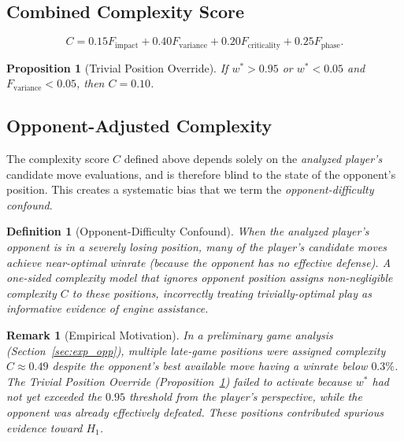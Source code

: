 \documentclass[11pt,a4paper]{article}
\newtheorem{definition}{Definition}
\newtheorem{proposition}{Proposition}
\newtheorem{remark}{Remark}
\begin{document}
\subsection{Combined Complexity Score}

\begin{equation}
    C = 0.15 F_{\text{impact}} + 0.40 F_{\text{variance}}
    + 0.20 F_{\text{criticality}} + 0.25 F_{\text{phase}}.
    \label{eq:complexity}
\end{equation}

\begin{proposition}[Trivial Position Override]
\label{prop:trivial}
If $w^* > 0.95$ or $w^* < 0.05$ and $F_{\text{variance}} < 0.05$,
then $C = 0.10$.
\end{proposition}

\subsection{Opponent-Adjusted Complexity}
\label{sec:opp_complexity}

The complexity score $C$ defined above depends solely on the \emph{analyzed
player's} candidate move evaluations, and is therefore blind to the state
of the opponent's position. This creates a systematic bias that we term
the \emph{opponent-difficulty confound}.

\begin{definition}[Opponent-Difficulty Confound]
\label{def:opp_confound}
When the analyzed player's opponent is in a severely losing position,
many of the player's candidate moves achieve near-optimal winrate
(because the opponent has no effective defense). A one-sided complexity
model that ignores opponent position assigns non-negligible complexity
$C$ to these positions, incorrectly treating trivially-optimal play as
informative evidence of engine assistance.
\end{definition}

\begin{remark}[Empirical Motivation]
\label{rem:opp_motivation}
In a preliminary game analysis (Section~\ref{sec:exp_opp}), multiple
late-game positions were assigned complexity $C \approx 0.49$ despite the
opponent's best available move having a winrate below $0.3\%$.
The Trivial Position Override (Proposition~\ref{prop:trivial}) failed to
activate because $w^*$ had not yet exceeded the $0.95$ threshold from the
player's perspective, while the opponent was already effectively defeated.
These positions contributed spurious evidence toward $H_1$.
\end{remark}
\end{document}
